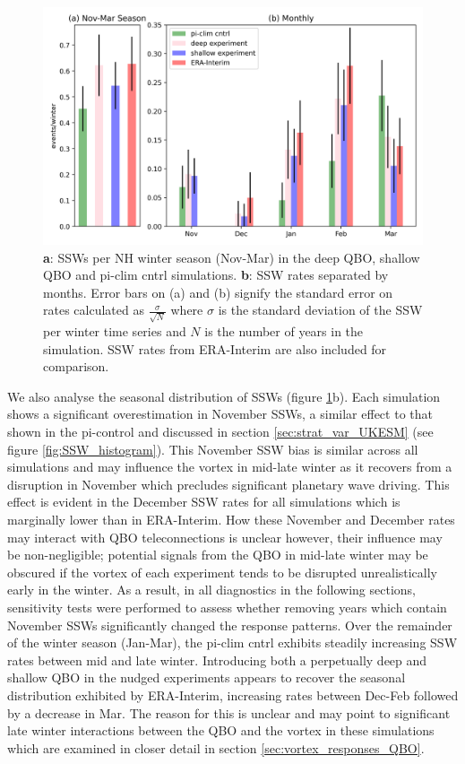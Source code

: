 \begin{figure}[h!]
\begin{center}
\noindent\includegraphics[width = 0.8\linewidth]{Figures/Figures-deepQBO/SSW_hist.png}
\caption[SSWs per NH winter season in QBO experiments]{\textbf{a}: SSWs per NH winter season (Nov-Mar) in the deep QBO, shallow QBO and pi-clim cntrl simulations. \textbf{b}: SSW rates separated by months. Error bars on (a) and (b) signify the standard error on rates calculated as $\frac{\sigma}{\sqrt{N}}$ where $\sigma$ is the standard deviation of the SSW per winter time series and $N$ is the number of years in the simulation. SSW rates from ERA-Interim are also included for comparison.}
\label{fig:SSW_histogram_experiments}
\end{center}
\end{figure}

We also analyse the seasonal distribution of SSWs (figure \ref{fig:SSW_histogram_experiments}b). Each simulation shows a significant overestimation in November SSWs, a similar effect to that shown in the pi-control and discussed in section \ref{sec:strat_var_UKESM} (see figure \ref{fig:SSW_histogram}). This November SSW bias is similar across all simulations and may influence the vortex in mid-late winter as it recovers from a disruption in November which precludes significant planetary wave driving. This effect is evident in the December SSW rates for all simulations which is marginally lower than in ERA-Interim. How these November and December rates may interact with QBO teleconnections is unclear however, their influence may be non-negligible; potential signals from the QBO in mid-late winter may be obscured if the vortex of each experiment tends to be disrupted unrealistically early in the winter. As a result, in all diagnostics in the following sections, sensitivity tests were performed to assess whether removing years which contain November SSWs significantly changed the response patterns. Over the remainder of the winter season (Jan-Mar), the pi-clim cntrl exhibits steadily increasing SSW rates between mid and late winter. Introducing both a perpetually deep and shallow QBO in the nudged experiments appears to recover the seasonal distribution exhibited by ERA-Interim, increasing rates between Dec-Feb followed by a decrease in Mar. The reason for this is unclear and may point to significant late winter interactions between the QBO and the vortex in these simulations which are examined in closer detail in section \ref{sec:vortex_responses_QBO}.

